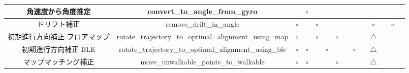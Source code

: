 \begin{table}[ht]
{\begin{tabular}{|c|c|c|c|c|c|c|c|c|c|c|c|c|c|}
			角速度から角度推定       & convert\_to\_angle\_from\_gyro                                      &                              & \multicolumn{1}{c|}{$\circ$} &                              &                              &                              &                                                                                                               &                              &                                  &                                  &    &                              &    \\ \hline
			ドリフト補正          & remove\_drift\_in\_angle                                            & \multicolumn{1}{c|}{$\circ$} &                              & \multicolumn{1}{c|}{$\circ$} &                              &                              &                                                                                                               &                              &                                  & \multicolumn{1}{c|}{$\circ$}     &    & \multicolumn{1}{c|}{$\circ$} &    \\ \hline
			初期進行方向補正 フロアマップ & rotate\_trajectory\_to\_optimal\_alignment\_using\_map              & \multicolumn{1}{c|}{$\circ$} &                              & \multicolumn{1}{c|}{$\circ$} &                              & \multicolumn{1}{c|}{$\circ$} &                                                                                                               &                              &                                  & \multicolumn{1}{c|}{$\triangle$} &    &                              &    \\ \hline
			初期進行方向補正 BLE    & rotate\_trajectory\_to\_optimal\_alignment\_using\_ble              & \multicolumn{1}{c|}{$\circ$} & \multicolumn{1}{c|}{$\circ$} &                              & \multicolumn{1}{c|}{$\circ$} &                              &                                                                                                               & \multicolumn{1}{c|}{$\circ$} &                                  & \multicolumn{1}{c|}{$\triangle$} &    &                              &    \\ \hline
			マップマッチング補正      & move\_unwalkable\_points\_to\_walkable                              & \multicolumn{1}{c|}{$\circ$} & \multicolumn{1}{c|}{$\circ$} &                              &                              & \multicolumn{1}{c|}{$\circ$} &                                                                                                               &                              &                                  & \multicolumn{1}{c|}{$\triangle$} &    &                              &    \\ \hline

\end{tabular}}
\end{table}

